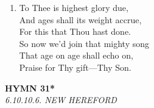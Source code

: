 \begin{enumerate}
    \item To Thee is highest glory due, \\
        And ages shall its weight accrue, \\
        For this that Thou hast done. \\
        So now we'd join that mighty song \\
        That age on age shall echo on, \\
        Praise for Thy gift---Thy Son.

\end{enumerate}

\newpage
\begin{center}
    {\Large \textbf{HYMN 31*}}
    \\
    \textit{6.10.10.6. NEW HEREFORD}
\end{center}
\vspace{1em}


